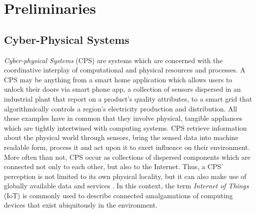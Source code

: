 \chapter{Preliminaries}\label{chapter:preliminaries}

\section{Cyber-Physical Systems}
\emph{Cyber-physical Systems} (CPS) are systems which are concerned with the coordinative interplay of computational and physical resources and processes. A CPS may be anything from a smart home application which allows users to unlock their doors via smart phone app, a collection of sensors dispersed in an industrial plant that report on a product's quality attributes, to a smart grid that algorithmically controls a region's electricity production and distribution.
All these examples have in common that they involve physical, tangible appliances which are tightly intertwined with computing systems.
CPS retrieve information about the physical world through sensors, bring the sensed data into machine readable form, process it and act upon it to exert influence on their environment. More often than not, CPS occur as collections of dispersed components which are connected not only to each other, but also to the Internet. Thus, a CPS' perception is not limited to its own physical locality, but it can also make use of globally available data and services \cite{broy2012cyber}. In this context, the term \emph{Internet of Things} (IoT) is commonly used to describe connected amalgamations of computing devices that exist ubiquitously in the environment.

